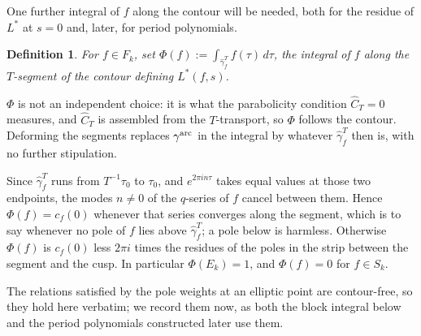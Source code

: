 \documentclass[11pt]{article}
\newtheorem{definition}[theorem]{Definition}
\begin{document}
One further integral of $f$ along the contour will be needed, both for the residue of $L^*$ at
$s=0$ and, later, for period polynomials.

\begin{definition}\label{def:Phi}
For $f\in F_k$, set $\Phi(f):=\int_{\hat\gamma^T_f}f(\tau)\,d\tau$, the integral of $f$ along the
$T$-segment of the contour defining $L^*(f,s)$.
\end{definition}

$\Phi$ is not an independent choice: it is what the parabolicity condition $\hat C_T=0$ measures,
and $\hat C_T$ is assembled from the $T$-transport, so $\Phi$ follows the contour. Deforming the
segments replaces $\gamma^{\rm arc}$ in the integral by whatever $\hat\gamma^T_f$ then is, with no
further stipulation.

Since $\hat\gamma^T_f$ runs from $T^{-1}\tau_0$ to $\tau_0$, and $e^{2\pi in\tau}$ takes equal
values at those two endpoints, the modes $n\neq0$ of the $q$-series of $f$ cancel between them.
Hence $\Phi(f)=c_f(0)$ whenever that series converges along the segment, which is to say whenever
no pole of $f$ lies above $\hat\gamma^T_f$; a pole below is harmless. Otherwise $\Phi(f)$ is
$c_f(0)$ less $2\pi i$ times the residues of the poles in the strip between the segment and the
cusp. In particular $\Phi(E_k)=1$, and $\Phi(f)=0$ for $f\in S_k$.

The relations satisfied by the pole weights at an elliptic point are contour-free, so they hold
here verbatim; we record them now, as both the block integral below and the period polynomials
constructed later use them.
\end{document}
